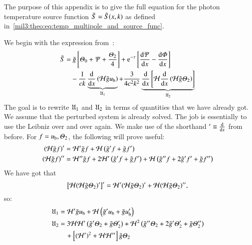 

The purpose of this appendix is to give the full equation for the photon temperature source function $\tilde{S}=\tilde{S}(x, k)$ as defined in~\cref{mil3:theo:eq:temp_multipole_and_source_func}.

We begin with the expression from~\citet[Eq.~(40)]{Callin2006}:
\begin{equation}\label{app:source:eq:source_function}
\begin{split}
    \tilde{S} =&~ \gt \left[\Theta_0 + \Psi + \frac{\Theta_2}{4}\right] + \eu[-\tau]\left[ \dv{\Psi}{x} -\dv{\Phi}{x} \right] \\
    &- \frac{1}{ck} \underbrace{\dv{}{x}\left(\Hp \gt u\ped{b} \right)}_{\expr_1}+ \frac{3}{4c^2k^2} \underbrace{\dv{}{x}\left[ \Hp \dv{}{x}\left(\Hp \gt\Theta_2 \right)  \right]}_{\expr_2}
\end{split}
\end{equation}
The goal is to rewrite $\mathfrak{U}_1$ and $\mathfrak{U}_2$ in terms of quantities that we have already got. We assume that the perturbed system is already solved. The job is essentially to use the Leibniz over and over again. We make use of the shorthand $'\equiv \dv{}{x}$ from before. For $f=u_\mathrm{b}, \varTheta_2 $, the following will prove useful:
\begin{subequations}
\begin{align}
    \left(\mathcal{H} \tilde{g} f \right)' &= \mathcal{H}'\tilde{g} f + \mathcal{H} \left( \tilde{g}' f + \tilde{g} f'\right)\\
    \left(\mathcal{H} \tilde{g} f \right)''&= \mathcal{H}'' \tilde{g} f + 2\mathcal{H}' \left(\tilde{g}' f + \tilde{g} f'\right) + \mathcal{H} \left(\tilde{g}'' f + 2\tilde{g}' f' + \tilde{g} f'' \right)
\end{align}
\end{subequations}
We have got that 
\begin{equation}
    \left[\mathcal{H} (\mathcal{H} \tilde{g} \varTheta_2)' \right]' = \mathcal{H}' (\mathcal{H} \tilde{g} \varTheta_2)' + \mathcal{H} (\mathcal{H} \tilde{g} \varTheta_2)'',
\end{equation}
so:
\begin{subequations}\label{app:source:eq:expressions}
\begin{align}
    \mathfrak{U}_1 &= \mathcal{H}'\tilde{g} u_\mathrm{b} + \mathcal{H} \left( \tilde{g}' u_\mathrm{b} + \tilde{g} u_\mathrm{b}'\right) \\
    \mathfrak{U}_2 &= 3\mathcal{H} \mathcal{H}' \left(\tilde{g}' \varTheta_2 + \tilde{g} \varTheta_2'\right) + \mathcal{H}^2\left(\tilde{g}'' \varTheta_2 +2 \tilde{g}' \varTheta_2' + \tilde{g} \varTheta_2''\right) \nonumber \\
    & \quad + \left[(\mathcal{H}')^2 + \mathcal{H} \mathcal{H}''\right]\tilde{g} \varTheta_2 \label{app:source:eq:expr1}
\end{align}
\end{subequations}
